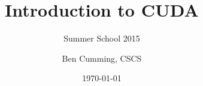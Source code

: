 \documentclass[aspectratio=43]{beamer}
\author{Ben Cumming, CSCS}
\title{Introduction to CUDA}
\subtitle{Summer School 2015}
\date{\today}
\begin{document}
\cscstitle


%
%
%


%
\end{document}
